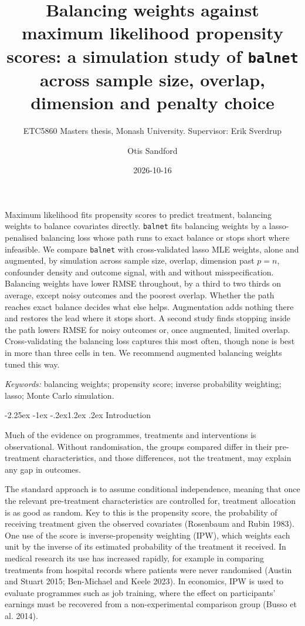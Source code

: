 \documentclass[
  12pt,
  a4paper,
]{article}
\title{Balancing weights against maximum likelihood propensity scores: a
simulation study of \texttt{balnet} across sample size, overlap,
dimension and penalty choice}
\subtitle{ETC5860 Masters thesis, Monash University. Supervisor: Erik
Sverdrup}
\author{Otis Sandford}
\date{2026-10-16}
\makeatletter
\newcounter{none} %
\renewcommand\section{\@startsection{section}{1}{\z@}%
  {-2.25ex \@plus -1ex \@minus -.2ex}{1.2ex \@plus .2ex}%
  {\normalfont\Large\bfseries}}
\renewenvironment{abstract}{%
  \small
  \begin{center}{\bfseries\abstractname\vspace{-.5em}\vspace{\z@}}\end{center}%
  \list{}{\listparindent\z@ \itemindent\z@ \rightmargin\leftmargin
          \parsep 6pt \@plus 2pt}%
  \item\relax}{\endlist}
\makeatother
\begin{document}
\maketitle
\begin{abstract}
Maximum likelihood fits propensity scores to predict treatment,
balancing weights to balance covariates directly. \texttt{balnet} fits
balancing weights by a lasso-penalised balancing loss whose path runs to
exact balance or stops short where infeasible. We compare
\texttt{balnet} with cross-validated lasso MLE weights, alone and
augmented, by simulation across sample size, overlap, dimension past
\(p = n\), confounder density and outcome signal, with and without
misspecification. Balancing weights have lower RMSE throughout, by a
third to two thirds on average, except noisy outcomes and the poorest
overlap. Whether the path reaches exact balance decides what else helps.
Augmentation adds nothing there and restores the lead where it stops
short. A second study finds stopping inside the path lowers RMSE for
noisy outcomes or, once augmented, limited overlap. Cross-validating the
balancing loss captures this most often, though none is best in more
than three cells in ten. We recommend augmented balancing weights tuned
this way.

\emph{Keywords:} balancing weights; propensity score; inverse
probability weighting; lasso; Monte Carlo simulation.
\end{abstract}


\section{Introduction}\label{introduction}

Much of the evidence on programmes, treatments and interventions is
observational. Without randomisation, the groups compared differ in
their pre-treatment characteristics, and those differences, not the
treatment, may explain any gap in outcomes.

The standard approach is to assume conditional independence, meaning
that once the relevant pre-treatment characteristics are controlled for,
treatment allocation is as good as random. Key to this is the propensity
score, the probability of receiving treatment given the observed
covariates (Rosenbaum and Rubin 1983). One use of the score is
inverse-propensity weighting (IPW), which weights each unit by the
inverse of its estimated probability of the treatment it received. In
medical research its use has increased rapidly, for example in comparing
treatments from hospital records where patients were never randomised
(Austin and Stuart 2015; Ben-Michael and Keele 2023). In economics, IPW
is used to evaluate programmes such as job training, where the effect on
participants' earnings must be recovered from a non-experimental
comparison group (Busso et al. 2014).
\end{document}
